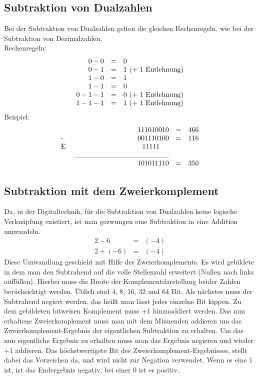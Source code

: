 \documentclass[a4paper,12pt,fleqn,oneside]{article}
\begin{document}
	\subsection{Subtraktion von Dualzahlen}
  		Bei der Subtraktion von Dualzahlen gelten die gleichen Rechenregeln, wie bei der Subtraktion von Dezimalzahlen.\\
  		Rechenregeln:
		\[ \begin{array}{rcll}
   			 0 - 0 & = & 0													\\
  		         0 - 1 & = & 1$ (+ 1 Entlehnung)$									\\
    			 1 - 0 & = & 1													\\
			 1 - 1 & = & 0													\\
    		    0 - 1 - 1 & = & 0$ (+ 1 Entlehnung)$									\\
    		    1 - 1 - 1 & = & 1$ (+ 1 Entlehnung)$
		\end{array} \]
		Beispiel:
		\[ \begin{array}{lrcll}
   				&		 	       	 1 1 1 0 1 0 0 1 0 		& = & 466 			\\
  		       	$- $ &				 0 0 1 1 1 0 1 0 0 		& = & 116				\\
  		       	$E $ &      			            1 1 1 1 1$ $$ $$ $$ $        	 				\\
    				&	\_\_\_\_\_\_\_\_\_\_\_\_\_\_\_\_\_\_							\\
    		   		&			      	  1 0 1 0 1 1 1 1 0		 & = & 350
		\end{array} \]

\newpage

	\subsection{Subtraktion mit dem Zweierkomplement}
		Da, in der Digitaltechnik, für die Subtraktion von Dualzahlen keine logische Verknüpfung existiert, ist man gezwungen eine
		Subtraktion in eine Addition umwandeln.
		\[ \begin{array}{rcl}
   				 2 - 6       & = & (-4)			\\
  			         2 + (-6)   & = & (-4)
		\end{array} \]
		\vspace{\baselineskip}
		Diese Umwandlung geschieht mit Hilfe des Zweierkomplements. Es wird gebildete in dem man den Subtrahend auf die volle
		Stellenzahl erweitert (Nullen nach links auffüllen). Hierbei muss die Breite der Komplementdarstellung beider Zahlen
		berücksichtigt werden. Üblich sind 4, 8, 16, 32 und 64 Bit. Als nächstes muss der Subtrahend negiert werden, das heißt
		man lässt jedes einzelne Bit kippen. Zu dem gebildeten bitweisen Komplement muss $+ 1$ hinzuaddiert werden. Das nun
		erhaltene Zweierkomplement muss man mit dem Minuenden addieren um das Zweierkomplement-Ergebnis der eigentlichen
		Subtraktion zu erhalten. Um das nun eigentliche Ergebnis zu erhalten muss man das Ergebnis negieren und wieder $+ 1$
		addieren. Das höchstwertigste Bit des Zweierkomplement-Ergebnisses, stellt dabei das Vorzeichen da, und wird nicht zur
		Negation verwendet. Wenn es eine 1 ist, ist das Endergebnis negativ, bei einer 0 ist es positiv. \\
		\\
\end{document}
